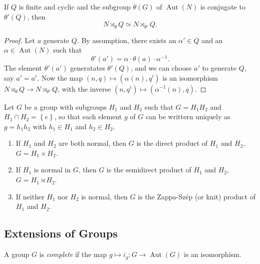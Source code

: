 \begin{lemma}
  \label{lemma-criteria-semidirect-product-3}
  If \( Q \) is finite and cyclic and the subgroup \( \theta(G) \) of \( \operatorname{Aut}(N) \) is conjugate to \( \theta'(Q) \), then
  \[
    N \rtimes_\theta Q \simeq N \rtimes_{\theta'}  Q.
  \]
\end{lemma}
\begin{proof}
  Let \( a \) generate \( Q \).
  By assumption, there exists an \( \alpha' \in Q \) and an \( \alpha \in \operatorname{Aut}(N) \) such that
  \[
    \theta'(a') = \alpha \cdot \theta(a) \cdot \alpha^{-1}.
  \]
  The element \( \theta'(a') \) generatates \( \theta'(Q) \), and we can choose \( a' \) to generate \( Q \), say \( a' = a^i \).
  Now the map \( (n, q) \mapsto (\alpha(n), q^i) \) is an isomorphism \( N \rtimes_\theta Q \to N \rtimes_{\theta'} Q \), with the inverse \( (n, q^i) \mapsto (\alpha^{-1}(n), q) \).
\end{proof}

\begin{theorem}
  \label{theorem-criteria-semidirect-product}
  Let \( G \) be a group with subgroups \( H_1 \) and \( H_2 \) such that \( G = H_1 H_2 \) and \( H_1 \cap H_2 = \left\lbrace e \right\rbrace \), so that each element \( g \) of \( G \) can be writtern uniquely as \( g = h_1 h_2 \) with \( h_1 \in H_1 \) and \( h_2 \in H_2 \).
  \begin{enumerate}
    \item If \( H_1 \) and \( H_2 \) are both normal, then \( G \) is the direct product of \( H_1 \) and \( H_2 \), \( G = H_1 \times H_2 \).
    \item If \( H_1 \) is normal in \( G \), then \( G \) is the semidirect product of \( H_1 \) and \( H_2 \), \( G = H_1 \rtimes H_2 \).
    \item If neither \( H_1 \) nor \( H_2 \) is normal, then \( G \) is the Zappa-Sz\'{e}p (or knit) product of \( H_1 \) and \( H_2 \).
  \end{enumerate}
\end{theorem}

\subsection{Extensions of Groups}
\label{subsection-extensions-of-groups}


\begin{definition}
  \label{definition-complete-group}
  A group \( G \) is \emph{complete} if the map \( g \mapsto i_g: G \to \operatorname{Aut}(G) \) is an isomorphism.
\end{definition}

